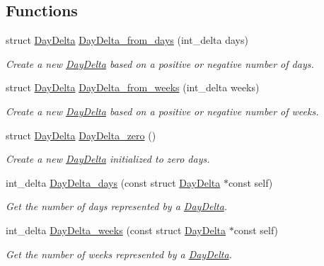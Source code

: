 \subsection*{\-Functions}
\begin{DoxyCompactItemize}
\item 
struct \hyperlink{structDayDelta}{\-Day\-Delta} \hyperlink{day-delta_8h_a50a5b111e380372e918e4d67f4b1814d}{\-Day\-Delta\-\_\-from\-\_\-days} (int\-\_\-delta days)
\begin{DoxyCompactList}\small\item\em \-Create a new \hyperlink{structDayDelta}{\-Day\-Delta} based on a positive or negative number of days. \end{DoxyCompactList}\item 
struct \hyperlink{structDayDelta}{\-Day\-Delta} \hyperlink{day-delta_8h_ac44c70541cf4f255f25384194341ff07}{\-Day\-Delta\-\_\-from\-\_\-weeks} (int\-\_\-delta weeks)
\begin{DoxyCompactList}\small\item\em \-Create a new \hyperlink{structDayDelta}{\-Day\-Delta} based on a positive or negative number of weeks. \end{DoxyCompactList}\item 
struct \hyperlink{structDayDelta}{\-Day\-Delta} \hyperlink{day-delta_8h_ab87d828518fe1bdc7e7662be3e5e6289}{\-Day\-Delta\-\_\-zero} ()
\begin{DoxyCompactList}\small\item\em \-Create a new \hyperlink{structDayDelta}{\-Day\-Delta} initialized to zero days. \end{DoxyCompactList}\item 
int\-\_\-delta \hyperlink{day-delta_8h_aa57ce59c7908dcad9d8dcc18c84909a6}{\-Day\-Delta\-\_\-days} (const struct \hyperlink{structDayDelta}{\-Day\-Delta} $\ast$const self)
\begin{DoxyCompactList}\small\item\em \-Get the number of days represented by a \hyperlink{structDayDelta}{\-Day\-Delta}. \end{DoxyCompactList}\item 
int\-\_\-delta \hyperlink{day-delta_8h_ae0cf870931630123311dc3f532916813}{\-Day\-Delta\-\_\-weeks} (const struct \hyperlink{structDayDelta}{\-Day\-Delta} $\ast$const self)
\begin{DoxyCompactList}\small\item\em \-Get the number of weeks represented by a \hyperlink{structDayDelta}{\-Day\-Delta}. \end{DoxyCompactList}\item 

\end{DoxyCompactItemize}
